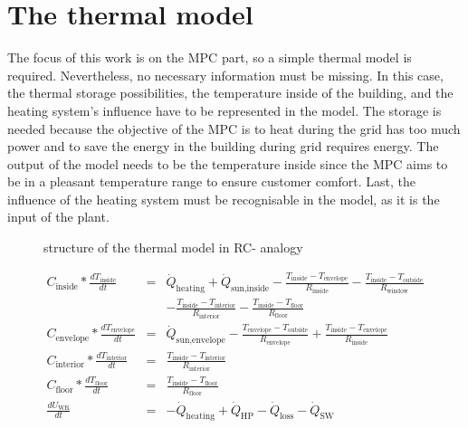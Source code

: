 \section{The thermal model}
\label{thermalmodel}

    The focus of this work is on the MPC part, so a simple thermal model is required. Nevertheless, no necessary information must be missing. In this case, the thermal storage possibilities, the temperature inside of the building, and the heating system's influence have to be represented in the model. The storage is needed because the objective of the MPC is to heat during the grid has too much power and to save the energy in the building during grid requires energy. The output of the model needs to be the temperature inside since the MPC aims to be in a pleasant temperature range to ensure customer comfort. Last, the influence of the heating system must be recognisable in the model, as it is the input of the plant. 
    \newline
    \begin{figure}
        \centering
        \def\svgwidth{320pt}
        
        \caption{structure of the thermal model in RC- analogy}
        \label{fig:structureThermalModel}
    \end{figure}
    
    \begin{align}
       \label{eq:meinModel2} 
       C_\text{inside}*\frac{d T_\text{inside}}{d t} &=& \dot{Q}_\text{heating} + \dot{Q}_\text{sun,inside} - \frac{T_\text{inside}-T_\text{envelope}}{R_\text{inside}} - \frac{T_\text{inside}-T_\text{outside}}{R_\text{window}} \\
       & &-\frac{T_\text{inside}-T_\text{interior}}{R_\text{interior}}-\frac{T_\text{inside}-T_\text{floor}}{R_\text{floor}} \nonumber\\
       C_\text{envelope}*\frac{d T_\text{envelope}}{d t} &=& \dot{Q}_\text{sun,envelope} - \frac{T_\text{envelope}-T_\text{outside}}{R_\text{envelope}} + \frac{T_\text{inside}-T_\text{envelope}}{R_\text{inside}} \nonumber \\
       C_\text{interior}*\frac{d T_\text{interior}}{d t} &=& \frac{T_\text{inside}-T_\text{interior}}{R_\text{interior}} \nonumber\\
       C_\text{floor}*\frac{d T_\text{floor}}{d t} &=& \frac{T_\text{inside}-T_\text{floor}}{R_\text{floor}} \nonumber\\
       \frac{d U_\text{WR}}{d t}&=& -\dot{Q}_\text{heating} + \dot{Q}_\text{HP} - \dot{Q}_\text{loss} - \dot{Q}_\text{SW} \nonumber
    \end{align}

